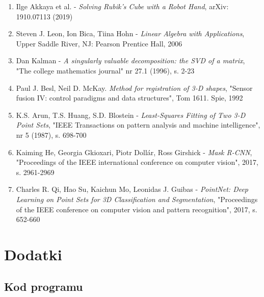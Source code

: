 \documentclass{article}
\begin{document}
\begin{enumerate}
\item Ilge Akkaya et al. - \emph{Solving Rubik's Cube with a Robot Hand}, arXiv: 1910.07113 (2019)

\item Steven J. Leon, Ion Bica, Tiina Hohn - \emph{Linear Algebra with Applications}, Upper Saddle River, NJ: Pearson Prentice Hall, 2006

\item Dan Kalman - \emph{A singularly valuable decomposition: the SVD of a matrix}, "The college mathematics journal" nr 27.1 (1996), s. 2-23

\item Paul J. Besl, Neil D. McKay. \emph{Method for registration of 3-D shapes}, "Sensor fusion IV: control paradigms and data structures", Tom 1611. Spie, 1992

\item K.S. Arun, T.S. Huang, S.D. Blostein - \emph{Least-Squares Fitting of Two 3-D Point Sets}, "IEEE Transactions on pattern analysis and machine intelligence", nr 5 (1987), s. 698-700

\item Kaiming He, Georgia Gkioxari, Piotr Dollár, Ross Girshick - \emph{Mask R-CNN}, "Proceedings of the IEEE international conference on computer vision", 2017, s. 2961-2969

\item Charles R. Qi, Hao Su, Kaichun Mo, Leonidas J. Guibas - \emph{PointNet: Deep Learning on Point Sets for 3D Classification and Segmentation}, "Proceedings of the IEEE conference on computer vision and pattern recognition", 2017, s. 652-660
\end{enumerate}

\newpage
\section*{\LARGE{Dodatki}}
\subsection*{\Large{Kod programu}}

\end{document}
